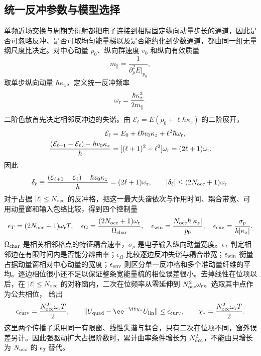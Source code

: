 
\subsection{统一反冲参数与模型选择}\label{subsec:recoil-regime-selection-dp47}

单频近场交换与周期势衍射都把电子连接到相隔固定纵向动量步长的通道，因此是否可忽略反冲、是否可取均匀能量梯以及是否能约化到少数通道，都由同一组无量纲尺度比决定。对中心动量 $p_0$、纵向群速度 $v_0$ 和纵向有效质量
\begin{equation*}
 m_\parallel=\frac{1}{\partial_p^2E|_{p_0}},
\end{equation*}
取单步纵向动量 $\hbar\kappa_z$，定义统一反冲频率
\begin{equation}
{\omega_{\rm r}=\frac{\hbar\kappa_z^2}{2m_\parallel}.}
\label{eq:unified_recoil_frequency_dp47}
\end{equation}
二阶色散首先决定相邻反冲边的失谐。由 $\mathcal E_\ell=E(p_0+\ell\hbar\kappa_z)$ 的二阶展开，
\begin{align*}
\mathcal E_\ell
&=E_0+\ell\hbar v_0\kappa_z+\ell^2\hbar\omega_{\rm r},\\
\frac{(\mathcal E_{\ell+1}-\mathcal E_\ell)-\hbar v_0\kappa_z}{\hbar}
&=[(\ell+1)^2-\ell^2]\omega_{\rm r}
=(2\ell+1)\omega_{\rm r}.
\end{align*}
因此
\begin{equation}
{
\delta_\ell
\equiv\frac{(\mathcal E_{\ell+1}-\mathcal E_\ell)-\hbar v_0\kappa_z}{\hbar}
=(2\ell+1)\omega_{\rm r},
\qquad
|\delta_\ell|\le(2N_{\rm occ}+1)\omega_{\rm r}.}
\label{eq:recoil_adjacent_detuning_bound_dp68}
\end{equation}
对于占据 $|\ell|\le N_{\rm occ}$ 的反冲格，把这一最大失谐依次与作用时间、耦合带宽、可用动量窗和输入包络比较，得到四个控制量
\begin{equation}
{
\epsilon_T=(2N_{\rm occ}+1)\omega_{\rm r}T,
\quad
\epsilon_\Omega=\frac{(2N_{\rm occ}+1)\omega_{\rm r}}{\Omega_{\rm char}},
\quad
\epsilon_{\rm win}=\frac{N_{\rm occ}\hbar|\kappa_z|}{p_0},
\quad
\epsilon_{\rm env}=\frac{\sigma_p}{\hbar|\kappa_z|}.}
\label{eq:recoil_regime_vector_dp47}
\end{equation}
$\Omega_{\rm char}$ 是相关相邻格点的特征耦合速率，$\sigma_p$ 是电子输入纵向动量宽度。$\epsilon_T$ 判定相邻边在有限时间内是否能分辨曲率；$\epsilon_\Omega$ 比较逐边反冲失谐与耦合带宽；$\epsilon_{\rm win}$ 衡量占据动量窗相对中心动量的宽度；$\epsilon_{\rm env}$ 则区分单一反冲格和多个准动量纤维的平均。逐边相位很小还不足以保证整条宽能量梳的相位误差很小。去掉线性在位项以后，在 $|\ell|\le N_{\rm occ}$ 的对称窗内，二次在位频率从零延伸到 $N_{\rm occ}^2\omega_{\rm r}$。选取其中点作为公共相位， 给出
\begin{equation}
\epsilon_{\rm curv}=\frac{N_{\rm occ}^2\omega_{\rm r}T}{2},\qquad
\|U_{\rm quad}-\ee^{-\ii\chi_*}U_{\rm lin}\|
\le\epsilon_{\rm curv},\qquad
\chi_*=\frac{N_{\rm occ}^2\omega_{\rm r}T}{2}.
\label{eq:recoil-window-curvature-phase}
\end{equation}
这里两个传播子采用同一有限窗、线性失谐与耦合，只有二次在位项不同，窗外误差另计。因此强驱动扩大占据阶数时，累计曲率条件增长为 $N_{\rm occ}^2$，不能由只增长为 $N_{\rm occ}$ 的 $\epsilon_T$ 替代。

